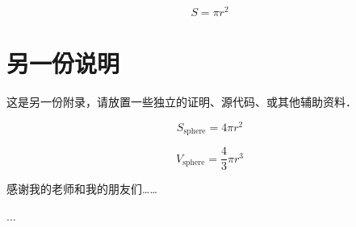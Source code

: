 \documentclass[lang=chs, degree=phd, blindreview=false, adobe=true]{yanputhesis}
\begin{document}
\begin{equation}
    S = \pi r^2
\end{equation}

\cleardoublepage

\chapter{另一份说明}

这是另一份附录，请放置一些独立的证明、源代码、或其他辅助资料．


\begin{equation}
    S_{\text{sphere}} = 4 \pi r^2
\end{equation}

\begin{equation}
    V_{\text{sphere}} = \frac43 \pi r^3
\end{equation}

\cleardoublepage
\backmatter                                                 %
\begin{acknowledgements}                                    %
    感谢我的老师和我的朋友们……
\end{acknowledgements}                                      %
\begin{accomplishments}                                     %
    [1] ...
\end{accomplishments}                                       %
\makestatement                                              %
\end{document}
